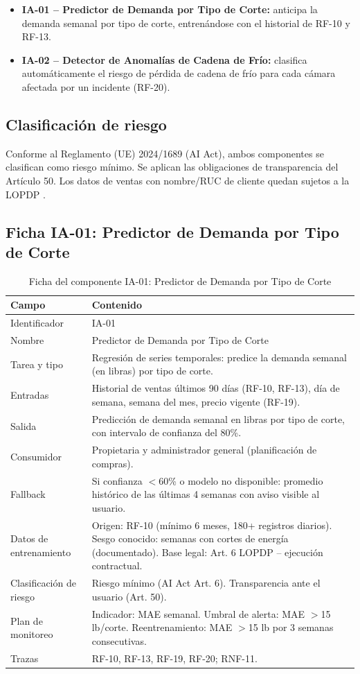 \documentclass[11pt,a4paper]{article}
\begin{document}
\begin{itemize}[nosep]
\item \textbf{IA-01 -- Predictor de Demanda por Tipo de Corte:} anticipa la demanda semanal por tipo de corte, entrenándose con el historial de RF-10 y RF-13.
\item \textbf{IA-02 -- Detector de Anomalías de Cadena de Frío:} clasifica automáticamente el riesgo de pérdida de cadena de frío para cada cámara afectada por un incidente (RF-20).
\end{itemize}

\subsection{Clasificación de riesgo}

Conforme al Reglamento (UE) 2024/1689 (AI Act), ambos componentes se clasifican como riesgo mínimo. Se aplican las obligaciones de transparencia del Artículo 50. Los datos de ventas con nombre/RUC de cliente quedan sujetos a la LOPDP \cite{lopd2021}.

\subsection{Ficha IA-01: Predictor de Demanda por Tipo de Corte}

\begin{longtable}{|p{3cm}|p{11cm}|}
\caption{Ficha del componente IA-01: Predictor de Demanda por Tipo de Corte}\\
\hline
\textbf{Campo} & \textbf{Contenido} \\
\hline
Identificador & IA-01 \\
\hline
Nombre & Predictor de Demanda por Tipo de Corte \\
\hline
Tarea y tipo & Regresión de series temporales: predice la demanda semanal (en libras) por tipo de corte. \\
\hline
Entradas & Historial de ventas últimos 90 días (RF-10, RF-13), día de semana, semana del mes, precio vigente (RF-19). \\
\hline
Salida & Predicción de demanda semanal en libras por tipo de corte, con intervalo de confianza del 80\%. \\
\hline
Consumidor & Propietaria y administrador general (planificación de compras). \\
\hline
Fallback & Si confianza $<$60\% o modelo no disponible: promedio histórico de las últimas 4 semanas con aviso visible al usuario. \\
\hline
Datos de entrenamiento & Origen: RF-10 (mínimo 6 meses, 180+ registros diarios). Sesgo conocido: semanas con cortes de energía (documentado). Base legal: Art. 6 LOPDP -- ejecución contractual. \\
\hline
Clasificación de riesgo & Riesgo mínimo (AI Act Art. 6). Transparencia ante el usuario (Art. 50). \\
\hline
Plan de monitoreo & Indicador: MAE semanal. Umbral de alerta: MAE $>$15 lb/corte. Reentrenamiento: MAE $>$15 lb por 3 semanas consecutivas. \\
\hline
Trazas & RF-10, RF-13, RF-19, RF-20; RNF-11. \\
\hline
\end{longtable}
\end{document}
